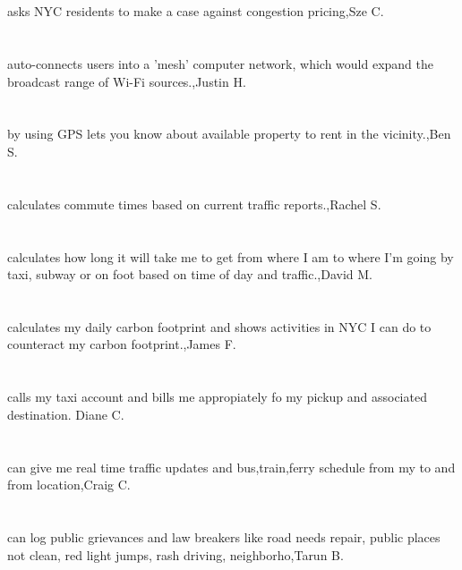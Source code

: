 \section{}asks NYC residents to make a case against congestion pricing,Sze C.
\section{}auto-connects users into a 'mesh' computer network, which would expand the broadcast range of Wi-Fi sources.,Justin H.
\section{}by using GPS lets you know about available property to rent in the vicinity.,Ben S.
\section{}calculates commute times based on current traffic reports.,Rachel S.
\section{}calculates how long it will take me to get from where I am to where I'm going by taxi, subway or on foot based on time of day and traffic.,David M.
\section{}calculates my daily carbon footprint and shows activities in NYC I can do to counteract my carbon footprint.,James F.
\section{}calls my taxi account and bills me appropiately fo my pickup and associated destination.  Diane C.
\section{} can give me real time traffic updates and bus,train,ferry schedule from my to and from location,Craig C.
\section{}can log public grievances and  law breakers like road needs repair, public places not clean, red light jumps, rash driving, neighborho,Tarun B.
